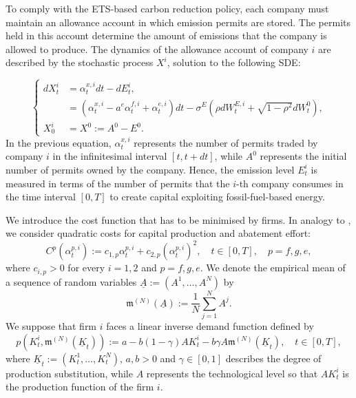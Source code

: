 \documentclass[11pt,twoside]{amsart}
\theoremstyle{definition}
\numberwithin{equation}{section}
\begin{document}
To comply with the ETS-based carbon reduction policy, each company must maintain an allowance account in which emission permits are stored. The permits held in this account determine the amount of emissions that the company is allowed to produce. The dynamics of the allowance account of company $i$ are described by the stochastic process $X^i$, solution to the following SDE:

\begin{equation}
\label{eqn: bank account company i}
\begin{cases}
dX^i_t &= \alpha^{x,i}_t dt- dE^i_t,\\
&= (\alpha^{x,i}_t - a^e \alpha^{f,i}_t + \alpha^{e,i}_t) dt -\sigma^E(\rho dW^{E,i}_t + \sqrt{1- \rho^2} dW^0_t),\\
X^i_0 &= X^0 := A^0 - E^0.
\end{cases} 
\end{equation}
In the previous equation, $\alpha^{x,i}_t$ represents the number of permits traded by company $i$ in the infinitesimal interval $[t,t+dt]$, while $A^0$ represents the initial number of permits owned by the company. Hence, the emission level $E^i_t$ is measured in terms of the number of permits that the $i$-th company consumes in the time interval $[0,T]$ to create capital exploiting fossil-fuel-based energy. 

We introduce the cost function that has to be minimised by firms. In analogy to \cite{del2024mean}, we consider quadratic costs for capital production and abatement effort:
\begin{equation*}
C^p(\alpha^{p,i}_t):= c_{1,p} \alpha^{p,i}_t + c_{2,p} (\alpha^{p,i}_t)^2,\quad t\in[0,T],\quad p = f,g,e,
\end{equation*}
where $c_{i,p}>0$ for every $i = 1,2$ and $p = f,g,e$. 
We denote the empirical mean of a sequence of random variables $\underline{A}:= (A^1,\dots,A^N)$ by
\begin{equation}
\label{eqn: empirical mean notation}
\mathfrak{m}^{(N)}(\underline{A}) := \frac{1}{N} \sum_{j = 1}^N A^j.
\end{equation}
We suppose that firm $i$ faces a linear inverse demand function defined by
\begin{equation}
\label{eqn: price good economy n}
p(K^i_t,\mathfrak{m}^{(N)}(\underline{K}_t)):= a- b(1-\gamma) AK^i_t - b\gamma A\mathfrak{m}^{(N)}(\underline{K}_t),\quad t\in[0,T],
\end{equation}
where $\underline{K}_t:= (K^1_t,\dots, K^N_t)$, $a,b>0$ and $\gamma \in[0,1]$ describes the degree of production substitution, while $A$ represents the technological level so that $AK^i_t$ is the production function of the firm $i$.
\end{document}
